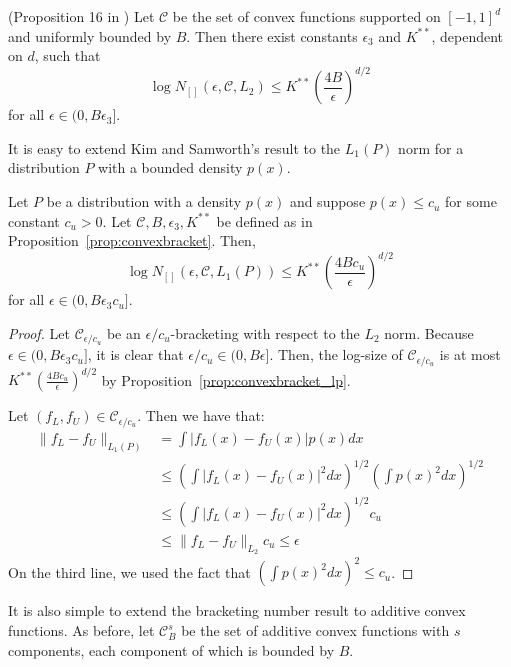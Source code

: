\begin{proposition} (Proposition 16 in \cite{kim2014global})
\label{prop:convexbracket}
Let $\mathcal{C}$ be the set of convex functions supported on $[-1, 1]^d$ and uniformly bounded by $B$. Then there exist constants $\epsilon_3$ and $K^{**}$, dependent on $d$, such that
\[
\log N_{[]} (\epsilon, \mathcal{C}, L_2) \leq K^{**} \left( \frac{4B}{\epsilon} \right)^{d/2}
\]
for all $\epsilon \in (0, B \epsilon_3]$.
\end{proposition}

It is easy to extend Kim and Samworth's result to the $L_1(P)$ norm for a distribution $P$ with a bounded density $p(x)$.

\begin{proposition}
\label{prop:convexbracket_lp}
Let $P$ be a distribution with a density $p(x)$ and suppose $p(x) \leq c_u$ for some constant $c_u >0$. Let $\mathcal{C}, B, \epsilon_3, K^{**}$ be defined as in Proposition~\ref{prop:convexbracket}. Then,
\[
\log N_{[]} (\epsilon, \mathcal{C}, L_1(P)) \leq K^{**} \left( \frac{4Bc_u}{\epsilon} \right)^{d/2}
\]
for all $\epsilon \in (0, B\epsilon_3 c_u]$.
\end{proposition}

\begin{proof}
Let $\mathcal{C}_{\epsilon/c_u}$ be an $\epsilon/c_u$-bracketing with respect to the $L_2$ norm. Because $\epsilon \in (0, B \epsilon_3 c_u]$, it is clear that $\epsilon/c_u \in (0, B\epsilon]$. Then, the log-size of $\mathcal{C}_{\epsilon/c_u}$ is at most $K^{**} \left( \frac{4Bc_u}{\epsilon} \right)^{d/2}$ by Proposition~\ref{prop:convexbracket_lp}. 

Let $(f_L, f_U) \in \mathcal{C}_{\epsilon/c_u}$. Then we have that:
\begin{align*}
\| f_L - f_U \|_{L_1(P)} &= \int | f_L(x) - f_U(x)| p(x) dx \\
   &\leq \left( \int | f_L(x) - f_U(x) |^2 dx \right)^{1/2}
      \left( \int p(x)^2 dx \right)^{1/2} \\
  &\leq \left( \int | f_L(x) - f_U(x)|^2 dx \right)^{1/2} c_u\\
 &\leq \| f_L - f_U \|_{L_2} c_u \leq \epsilon
\end{align*}
On the third line, we used the fact that $\left( \int p(x)^2 dx \right)^2 \leq c_u$.
\end{proof}

It is also simple to extend the bracketing number result to additive convex functions. As before, let $\mathcal{C}^s_B$ be the set of additive convex functions with $s$ components, each component of which is bounded by $B$.

